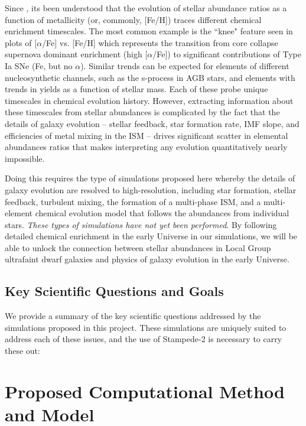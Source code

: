 \documentclass[12pt]{article} %
\begin{document}
Since \cite{Tinsley1980}, its been understood that the evolution of stellar abundance ratios as a function of metallicity (or, commonly, [Fe/H]) traces different chemical enrichment timescales. The most common example is the ``knee" feature seen in plots of $[\alpha$/Fe] vs. [Fe/H] which represents the transition from core collapse supernova dominant enrichment (high $[\alpha$/Fe]) to significant contributions of Type Ia SNe (Fe, but no $\alpha$). Similar trends can be expected for elements of different nucleosynthetic channels, such as the s-process in AGB stars, and elements with trends in yields as a function of stellar mass. Each of these probe unique timescales in chemical evolution history. However, extracting information about these timescales from stellar abundances is complicated by the fact that the details of galaxy evolution -- stellar feedback, star formation rate, IMF slope, and efficiencies of metal mixing in the ISM -- drives significant scatter in elemental abundances ratios that makes interpreting any evolution quantitatively nearly impossible. 

Doing this requires the type of simulations proposed here whereby the details of galaxy evolution are resolved to high-resolution, including star formation, stellar feedback, turbulent mixing, the formation of a multi-phase ISM, and a multi-element chemical evolution model that follows the abundances from individual stars. \textit{These types of simulations have not yet been performed}. By following detailed chemical enrichment in the early Universe in our simulations, we will be able to unlock the connection between stellar abundances in Local Group ultrafaint dwarf galaxies and physics of galaxy evolution in the early Universe.


\subsection{Key Scientific Questions and Goals}

We provide a summary of the key scientific questions addressed by the simulations proposed in this project. These simulations are uniquely suited to address each of these issues, and the use of Stampede-2 is necessary to carry these out:


\section{Proposed Computational Method and Model}
\end{document}
